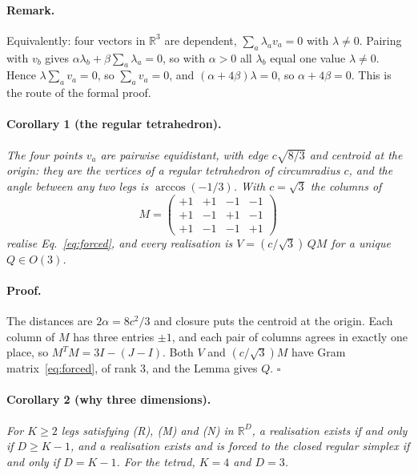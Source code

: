 \documentclass[twocolumn]{iopjournal}
\begin{document}
\paragraph{Remark.} Equivalently: four vectors in $\mathbb{R}^3$ are
dependent, $\sum_a \lambda_a v_a = 0$ with $\lambda \neq 0$. Pairing
with $v_b$ gives $\alpha\lambda_b + \beta\sum_a\lambda_a = 0$, so
with $\alpha > 0$ all $\lambda_b$ equal one value $\lambda \neq 0$.
Hence $\lambda\sum_a v_a = 0$, so $\sum_a v_a = 0$, and
$(\alpha + 4\beta)\lambda = 0$, so $\alpha + 4\beta = 0$. This is the
route of the formal proof.

\paragraph{Corollary 1 (the regular tetrahedron).} \textit{The four
points $v_a$ are pairwise equidistant, with edge $c\sqrt{8/3}$ and
centroid at the origin: they are the vertices of a regular
tetrahedron of circumradius $c$, and the angle between any two legs
is $\arccos(-1/3)$. With $c = \sqrt3$ the columns of}
\begin{equation}
  M = \begin{pmatrix}
    +1 & +1 & -1 & -1 \\
    +1 & -1 & +1 & -1 \\
    +1 & -1 & -1 & +1
  \end{pmatrix}
  \label{eq:M}
\end{equation}
\textit{realise Eq.~\eqref{eq:forced}, and every realisation is
$V = (c/\sqrt3)\,QM$ for a unique $Q \in O(3)$.}

\paragraph{Proof.} The distances are $2\alpha = 8c^2/3$ and closure
puts the centroid at the origin. Each column of $M$ has three
entries $\pm1$, and each pair of columns agrees in exactly one
place, so $M^TM = 3I - (J - I)$. Both $V$ and $(c/\sqrt3)M$ have
Gram matrix~\eqref{eq:forced}, of rank $3$, and the Lemma gives
$Q$. \hfill $\square$

\paragraph{Corollary 2 (why three dimensions).} \textit{For $K \ge 2$
legs satisfying (R), (M) and (N) in $\mathbb{R}^D$, a realisation
exists if and only if $D \ge K - 1$, and a realisation exists and is
forced to the closed regular simplex if and only if $D = K - 1$. For
the tetrad, $K = 4$ and $D = 3$.}
\end{document}
